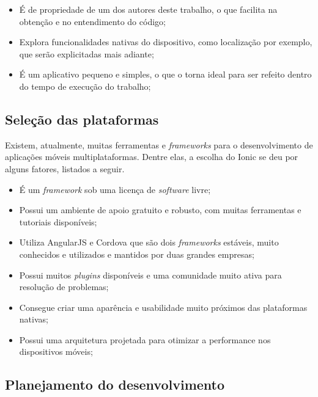 \begin{itemize}
    \item É de propriedade de um dos autores deste trabalho, o que facilita na obtenção e no entendimento do código;
    \item Explora funcionalidades nativas do dispositivo, como localização por exemplo, que serão explicitadas mais adiante;
    \item É um aplicativo pequeno e simples, o que o torna ideal para ser refeito dentro do tempo de execução do trabalho;
\end{itemize}

\subsection{Seleção das plataformas} \label{subsection:selecaodasplataformas}

Existem, atualmente, muitas ferramentas e \textit{frameworks} para o desenvolvimento de aplicações móveis multiplataformas. Dentre elas, a escolha do Ionic se deu por alguns fatores, listados a seguir. 

\begin{itemize}
    \item É um \textit{framework} sob uma licença de \textit{software} livre;
    \item Possui um ambiente de apoio gratuito e robusto, com muitas ferramentas e tutoriais disponíveis;
    \item Utiliza AngularJS e Cordova que são dois \textit{frameworks} estáveis, muito conhecidos e utilizados e mantidos por duas grandes empresas;
    \item Possui muitos \textit{plugins} disponíveis e uma comunidade muito ativa para resolução de problemas; %
    \item Consegue criar uma aparência e usabilidade muito próximos das plataformas nativas; %
    \item Possui uma arquitetura projetada para otimizar a performance nos dispositivos móveis; 
\end{itemize}
 
\subsection{Planejamento do desenvolvimento} \label{subsection:planejamentodesenvolvimento}

